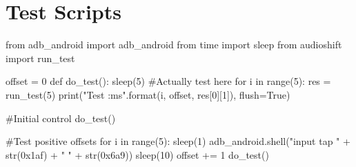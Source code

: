 \chapter{Test Scripts}\label{magicscripts}
\begin{mdframed}
    \begin{python}
from adb_android import adb_android
from time import sleep
from audioshift import run_test

offset = 0
def do_test():
    sleep(5)
    #Actually test here
    for i in range(5):
        res = run_test(5)
        print("Test {} {}:{}ms".format(i, offset, res[0][1]), flush=True)

#Initial control
do_test()

#Test positive offsets
for i in range(5):
    sleep(1)
    adb_android.shell("input tap " + str(0x1af) + " " + str(0x6a9))
    sleep(10)
    offset += 1
    do_test()
    \end{python}
    \label{ampme_next}
\end{mdframed}
\clearpage

